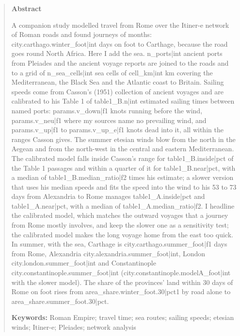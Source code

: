 \documentclass[11pt,a4paper]{article}
\begin{document}
\begin{quote}
\small
\begin{center}\textbf{Abstract}\end{center}
A companion study modelled travel from Rome over the Itiner-e network of Roman roads and found journeys of months: {{city.carthago.winter_foot|int}} days on foot to Carthage, because the road goes round North Africa. Here I add the sea. {{n_ports|int}} ancient ports from Pleiades and the ancient voyage reports are joined to the roads and to a grid of {{n_sea_cells|int}} sea cells of {{cell_km|int}} km covering the Mediterranean, the Black Sea and the Atlantic coast to Britain. Sailing speeds come from Casson's (1951) collection of ancient voyages and are calibrated to his Table 1 of {{table1_B.n|int}} estimated sailing times between named ports: {{params.v_down|f1}} knots running before the wind, {{params.v_neu|f1}} where my sources name no prevailing wind, and {{params.v_up|f1}} to {{params.v_up_e|f1}} knots dead into it, all within the ranges Casson gives. The summer etesian winds blow from the north in the Aegean and from the north-west in the central and eastern Mediterranean. The calibrated model falls inside Casson's range for {{table1_B.inside|pct}} of the Table 1 passages and within a quarter of it for {{table1_B.near|pct}}, with a median of {{table1_B.median_ratio|f2}} times his estimate; a slower version that uses his median speeds and fits the speed into the wind to his 53 to 73 days from Alexandria to Rome manages {{table1_A.inside|pct}} and {{table1_A.near|pct}}, with a median of {{table1_A.median_ratio|f2}}. I headline the calibrated model, which matches the outward voyages that a journey from Rome mostly involves, and keep the slower one as a sensitivity test; the calibrated model makes the long voyage home from the east too quick. In summer, with the sea, Carthage is {{city.carthago.summer_foot|f1}} days from Rome, Alexandria {{city.alexandria.summer_foot|int}}, London {{city.london.summer_foot|int}} and Constantinople {{city.constantinople.summer_foot|int}} ({{city.constantinople.modelA_foot|int}} with the slower model). The share of the provinces' land within 30 days of Rome on foot rises from {{area_share.winter_foot.30|pct1}} by road alone to {{area_share.summer_foot.30|pct}}.

\textbf{Keywords:} Roman Empire; travel time; sea routes; sailing speeds; etesian winds; Itiner-e; Pleiades; network analysis
\end{quote}
\end{document}

